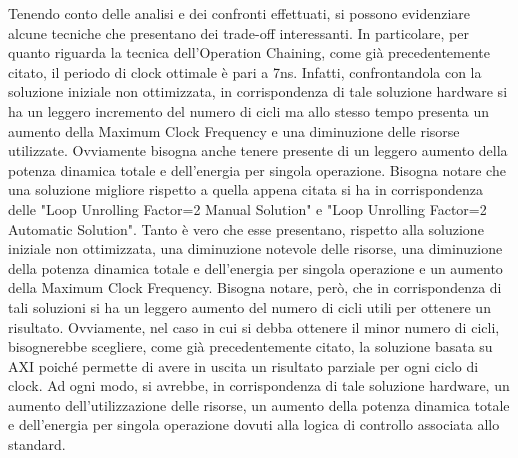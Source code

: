 Tenendo conto delle analisi e dei confronti effettuati, si possono evidenziare alcune tecniche che presentano dei trade-off interessanti. In particolare, per quanto riguarda la tecnica dell'Operation Chaining, come già precedentemente citato, il periodo di clock ottimale è pari a 7ns. Infatti, confrontandola con la soluzione iniziale non ottimizzata, in corrispondenza di tale soluzione hardware si ha un leggero incremento del numero di cicli ma allo stesso tempo presenta un aumento della Maximum Clock Frequency e una diminuzione delle risorse utilizzate. Ovviamente bisogna anche tenere presente di un leggero aumento della potenza dinamica totale e dell'energia per singola operazione. Bisogna notare che una soluzione migliore rispetto a quella appena citata si ha in corrispondenza delle "Loop Unrolling Factor=2 Manual Solution" e "Loop Unrolling Factor=2 Automatic Solution". Tanto è vero che esse presentano, rispetto alla soluzione iniziale non ottimizzata, una diminuzione notevole delle risorse, una diminuzione della potenza dinamica totale e dell'energia per singola operazione e un aumento della Maximum Clock Frequency. Bisogna notare, però, che in corrispondenza di tali soluzioni si ha un leggero aumento del numero di cicli utili per ottenere un risultato. Ovviamente, nel caso in cui si debba ottenere il minor numero di cicli, bisognerebbe scegliere, come già precedentemente citato, la soluzione basata su AXI poiché permette di avere in uscita un risultato parziale per ogni ciclo di clock. Ad ogni modo, si avrebbe, in corrispondenza di tale soluzione hardware, un aumento dell'utilizzazione delle risorse, un aumento della potenza dinamica totale e dell'energia per singola operazione dovuti alla logica di controllo associata allo standard.